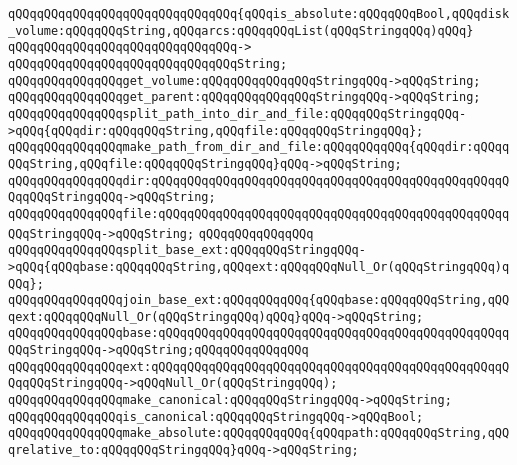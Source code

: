\verb|qQQqqQQqqQQqqQQqqQQqqQQqqQQqqQQq{qQQqis_absolute:qQQqqQQqBool,qQQqdisk_volume:qQQqqQQqString,qQQqarcs:qQQqqQQqList(qQQqStringqQQq)qQQq}|\newline
\verb|qQQqqQQqqQQqqQQqqQQqqQQqqQQqqQQq->|\newline
\verb|qQQqqQQqqQQqqQQqqQQqqQQqqQQqqQQqString;|\newline
\newline
\verb|qQQqqQQqqQQqqQQqget_volume:qQQqqQQqqQQqqQQqStringqQQq->qQQqString;|\newline
\verb|qQQqqQQqqQQqqQQqget_parent:qQQqqQQqqQQqqQQqStringqQQq->qQQqString;|\newline
\newline
\verb|qQQqqQQqqQQqqQQqsplit_path_into_dir_and_file:qQQqqQQqStringqQQq->qQQq{qQQqdir:qQQqqQQqString,qQQqfile:qQQqqQQqStringqQQq};|\newline
\verb|qQQqqQQqqQQqqQQqmake_path_from_dir_and_file:qQQqqQQqqQQq{qQQqdir:qQQqqQQqString,qQQqfile:qQQqqQQqStringqQQq}qQQq->qQQqString;|\newline
\verb|qQQqqQQqqQQqqQQqdir:qQQqqQQqqQQqqQQqqQQqqQQqqQQqqQQqqQQqqQQqqQQqqQQqqQQqqQQqStringqQQq->qQQqString;|\newline
\verb|qQQqqQQqqQQqqQQqfile:qQQqqQQqqQQqqQQqqQQqqQQqqQQqqQQqqQQqqQQqqQQqqQQqqQQqStringqQQq->qQQqString;|\newline
\verb|qQQqqQQqqQQqqQQq|\newline
\verb|qQQqqQQqqQQqqQQqsplit_base_ext:qQQqqQQqStringqQQq->qQQq{qQQqbase:qQQqqQQqString,qQQqext:qQQqqQQqNull_Or(qQQqStringqQQq)qQQq};|\newline
\verb|qQQqqQQqqQQqqQQqjoin_base_ext:qQQqqQQqqQQq{qQQqbase:qQQqqQQqString,qQQqext:qQQqqQQqNull_Or(qQQqStringqQQq)qQQq}qQQq->qQQqString;|\newline
\verb|qQQqqQQqqQQqqQQqbase:qQQqqQQqqQQqqQQqqQQqqQQqqQQqqQQqqQQqqQQqqQQqqQQqqQQqStringqQQq->qQQqString;qQQqqQQqqQQqqQQq|\newline
\verb|qQQqqQQqqQQqqQQqext:qQQqqQQqqQQqqQQqqQQqqQQqqQQqqQQqqQQqqQQqqQQqqQQqqQQqqQQqStringqQQq->qQQqNull_Or(qQQqStringqQQq);|\newline
\newline
\verb|qQQqqQQqqQQqqQQqmake_canonical:qQQqqQQqStringqQQq->qQQqString;|\newline
\verb|qQQqqQQqqQQqqQQqis_canonical:qQQqqQQqStringqQQq->qQQqBool;|\newline
\newline
\verb|qQQqqQQqqQQqqQQqmake_absolute:qQQqqQQqqQQq{qQQqpath:qQQqqQQqString,qQQqrelative_to:qQQqqQQqStringqQQq}qQQq->qQQqString;|\newline
